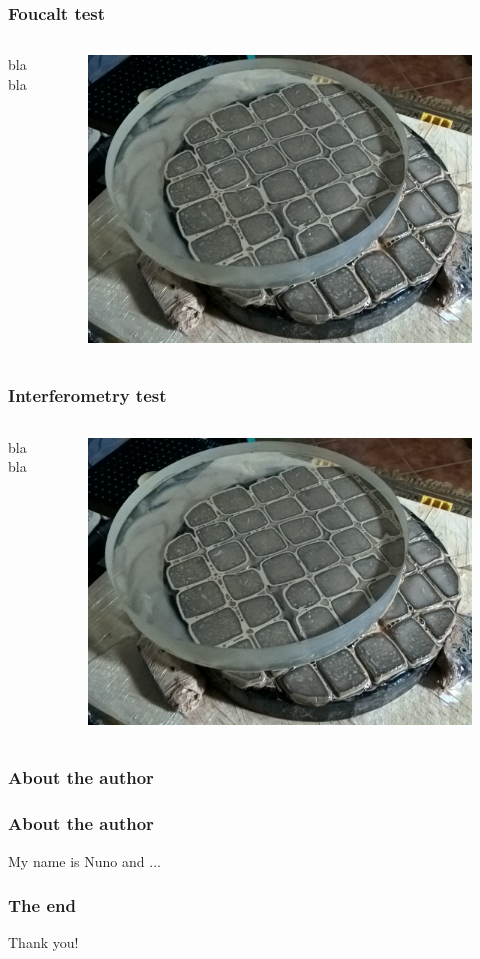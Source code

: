 \documentclass{beamer}
\begin{document}
\begin{frame}
\frametitle{Foucalt test}
\begin{columns}
bla bla
\begin{figure}
\includegraphics[scale=0.2]{assets/polishing.jpg}
\end{figure}
\end{columns}
\end{frame}

\begin{frame}
\frametitle{Interferometry test}
\begin{columns}
bla bla
\begin{figure}
\includegraphics[scale=0.2]{assets/polishing.jpg}
\end{figure}
\end{columns}
\end{frame}


\begin{frame}
\frametitle{About the author}

\end{frame}

\begin{frame}
\frametitle{About the author}
My name is Nuno and ...
\end{frame}

\begin{frame}
\frametitle{The end}
Thank you!
\end{frame}
\end{document}
